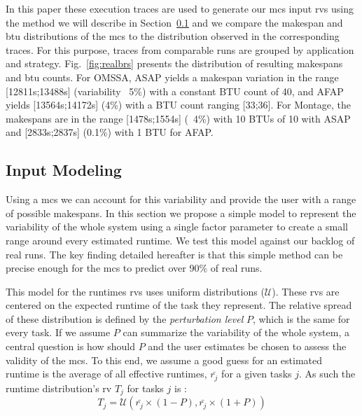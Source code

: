 \documentclass[]{llncs}
\begin{document}
In this  paper these execution  traces are used  to generate our  \ac{mcs} input
\acp{rv}  using the  method  we  will describe  in  Section~\ref{sec:im} and  we
compare  the  makespan  and  \ac{btu}  distributions  of  the  \ac{mcs}  to  the
distribution observed in the corresponding traces. For this purpose, traces from
comparable    runs     are    grouped     by    application     and    strategy.
Fig.~\ref{fig:realbrs} presents  the distribution  of resulting  makespans and
\ac{btu}  counts.  For  OMSSA, ASAP  yields a  makespan variation  in the  range
[12811s;13488s] (variability  ~5\%) with a  constant BTU  count of 40,  and AFAP
yields [13564s;14172s] (4\%) with a BTU  count ranging [33;36]. For Montage, the
makespans are in the range [1478s;1554s] (~4\%) with 10 BTUs of 10 with ASAP and
[2833s;2837s] (0.1\%) with 1 BTU for AFAP.


\subsection{Input Modeling}\label{sec:im}


Using a  \ac{mcs} we can account for this  variability and provide the
user with  a range of  possible makespans. In this  section we propose  a simple
model to  represent the variability of  the whole system using a single factor
parameter to create  a small range around every estimated  runtime. We test this %
model against our backlog of real runs. The key finding detailed hereafter is
that this simple method  can be precise enough for the  \ac{mcs} to predict over
90\% of real runs.

This model for the runtimes \acp{rv} uses uniform distributions ($\mathcal{U}$). 
These \acp{rv} are centered on the expected runtime of the task they represent.
The relative spread of these distribution is defined by the \emph{perturbation
level} $P$, which is the same for every task.  If we assume $P$ can summarize
the variability of the whole system, a central question is how should $P$ and
the user estimates be chosen to assess the validity of the \ac{mcs}. To this
end, we assume a good guess for an  estimated runtime is the  average of all
effective runtimes, $\bar{r_j}$ for a given tasks $j$. As such the runtime
distribution's \ac{rv} $T_j$ for tasks $j$ is : 
\begin{equation} 
	T_j = \mathcal{U}(\bar{r_j}\times(1-P), \bar{r_j}\times(1+P))
\end{equation}
\end{document}
